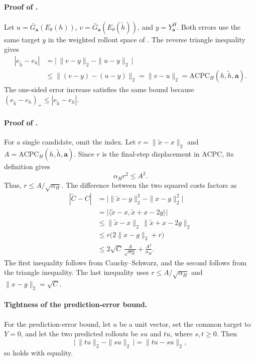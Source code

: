 \documentclass{article}
\begin{document}
\paragraph{Proof of .}
Let $u=\bar G_{\mathbf a}(E_\theta(h))$,
$v=\bar G_{\mathbf a}(E_\theta(\tilde h))$, and $y=Y_{\mathbf a}^H$. Both
errors use the same target $y$ in the weighted rollout space of
. The reverse triangle inequality gives
\begin{align}
|e_{\tilde h}-e_h|
&=\bigl|\,\|v-y\|_2-\|u-y\|_2\,\bigr| \\
&\le \|(v-y)-(u-y)\|_2
=\|v-u\|_2
=\mathrm{ACPC}_H(h,\tilde h,\mathbf a).
\end{align}
The one-sided error increase satisfies the same bound because
$(e_{\tilde h}-e_h)_+\le|e_{\tilde h}-e_h|$.

\paragraph{Proof of .}
For a single candidate, omit the index. Let $r=\|\tilde x-x\|_2$ and
$A=\mathrm{ACPC}_H(h,\tilde h,\mathbf a)$. Since $r$ is the final-step
displacement in ACPC, its definition gives
\[
\alpha_H r^2\leq A^2.
\]
Thus, $r\leq A/\sqrt{\alpha_H}$. The difference between the two squared costs
factors as
\begin{align}
|\tilde C-C|
&=\bigl|\|\tilde x-g\|_2^2-\|x-g\|_2^2\bigr| \\
&=\bigl|\langle \tilde x-x,\tilde x+x-2g\rangle\bigr| \\
&\le \|\tilde x-x\|_2\,\|\tilde x+x-2g\|_2 \\
&\le r\bigl(2\|x-g\|_2+r\bigr) \\
&\le 2\sqrt C\,\frac{A}{\sqrt{\alpha_H}}
+\frac{A^2}{\alpha_H}.
\end{align}
The first inequality follows from Cauchy--Schwarz, and the second follows from
the triangle inequality. The last inequality uses $r\leq A/\sqrt{\alpha_H}$
and $\|x-g\|_2=\sqrt C$.

\paragraph{Tightness of the prediction-error bound.}
For the prediction-error bound, let
$u$ be a unit vector, set the common target to $Y=0$, and let the two predicted
rollouts be $su$ and $tu$, where $s,t\geq0$. Then
\[
\bigl|\,\|tu\|_2-\|su\|_2\,\bigr|
=\|tu-su\|_2,
\]
so  holds with equality.
\end{document}

